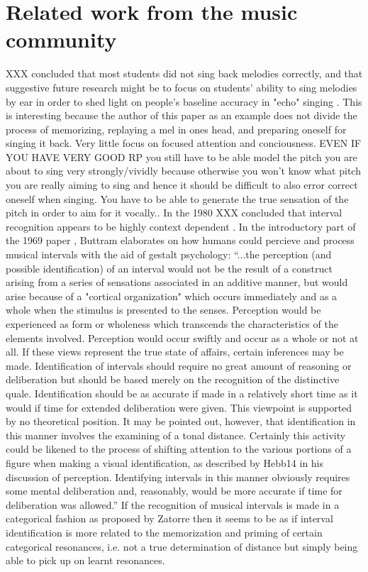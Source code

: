 \section{Related work from the music community}
XXX concluded that most students did not sing back melodies correctly, and that suggestive future research might be to focus on students’ ability to sing melodies by ear in order to shed light on people's baseline accuracy in "echo" singing \cite{crowder1984perception}. This is interesting because the author of this paper as an example does not divide the process of memorizing, replaying a mel in ones head, and preparing oneself for singing it back. Very little focus on focused attention and conciousness. EVEN IF YOU HAVE VERY GOOD RP you still have to be able model the pitch you are about to sing very strongly/vividly because otherwise you won’t know what pitch you are really aiming to sing and hence it should be difficult to also error correct oneself when singing. You have to be able to generate the true sensation of the pitch in order to aim for it vocally..
In the 1980 XXX concluded that interval recognition appears to be highly context dependent \cite{thompson2015music}.
In the introductory part of the 1969 paper \cite{buttram1969influence}, Buttram elaborates on how humans could percieve and process musical intervals with the aid of gestalt psychology: “...the perception (and possible identification) of an interval would not be the result of a construct arising from a series of sensations associated in an additive manner, but would arise because of a "cortical organization" which occurs immediately and as a whole when the stimulus is presented to the senses. Perception would be experienced as form or wholeness which transcends the characteristics of the elements involved. Perception would occur swiftly and occur as a whole or not at all. If these views represent the true state of affairs, certain inferences may be made. Identification of intervals should require no great amount of reasoning or deliberation but should be based merely on the recognition of the distinctive quale. Identification should be as accurate if made in a relatively short time as it would if time for extended deliberation were given. This viewpoint is supported by no theoretical position. It may be pointed out, however, that identification in this manner involves the examining of a tonal distance. Certainly this activity could be likened to the process of shifting attention to the various portions of a figure when making a visual identification, as described by Hebb14 in his discussion of perception. Identifying intervals in this manner obviously requires some mental deliberation and, reasonably, would be more accurate if time for deliberation was allowed.” \cite{terhardt1984concept}
If the recognition of musical intervals is made in a categorical fashion as proposed by Zatorre then it seems to be as if interval identification is more related to the memorization and priming of certain categorical resonances, i.e. not a true determination of distance but simply being able to pick up on learnt resonances.
